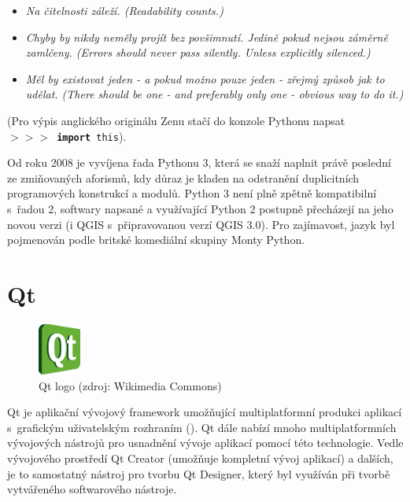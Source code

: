 \begin{itemize}

	\item \textit{Na čitelnosti záleží. (Readability counts.)}
			
	\item \textit{Chyby by nikdy neměly projít bez
povšimnutí. Jedině pokud nejsou záměrně za\-mlčeny. (Errors should never
pass silently. Unless explicitly silenced.)}
		
	\item \textit{Měl by existovat jeden - a pokud možno pouze
jeden - zřejmý způsob jak to udělat. (There should be one - and
preferably only one - obvious way to do it.)}
\end{itemize}

(Pro výpis anglického originálu Zenu stačí do konzole Pythonu napsat \\
\texttt{$>>>$~\textbf{import}~this}).

 Od roku 2008 je vyvíjena řada
Pythonu 3, která se snaží naplnit právě poslední ze zmiňovaných
aforismů, kdy důraz je kladen na odstranění duplicitních programových
konstrukcí a modulů. Python 3 není plně zpětně kompatibilní s~řadou 2,
softwary napsané a využívající Python 2 postupně přecházejí na jeho
novou verzi (i QGIS s~připravovanou verzí QGIS 3.0). Pro zajímavost,
jazyk byl pojmenován podle britské komediální skupiny Monty
Python. \cite{pythonHistory}

\section{Qt}

\begin{figure}[H] \centering
      \includegraphics[width=40pt]{./pictures/qt.png}
      \caption[Qt logo]{Qt logo (zdroj: Wikimedia Commons)}
      \label{fig:python}
\end{figure}

Qt je aplikační vývojový framework umožňující multiplatformní produkci
aplikací s~grafickým uživatelským rozhraním (). Qt dále nabízí
mnoho multiplatformních vývojových nástrojů pro usnadnění vývoje
aplikací pomocí této technologie. Vedle vývojového prostředí Qt
Creator (umožňuje kompletní vývoj aplikací) a dalších, je to
samostatný nástroj pro tvorbu  Qt Designer, který byl využíván
při tvorbě vytvářeného softwarového nástroje. \cite{qt}


